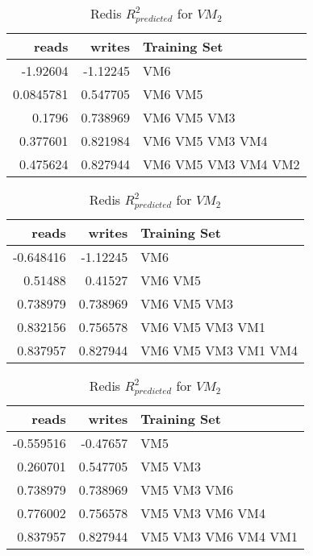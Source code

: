 \begin{table}
\centering
\caption{Redis $R_{predicted}^2$ for $VM_1$}
\begin{tabular}{|r|r|l|} \hline
reads&writes&Training Set\\ \hline
-1.92604 & -1.12245  & VM6 \\ \hline 
0.0845781 &  0.547705 & VM6 VM5 \\ \hline 
0.1796 &  0.738969 & VM6 VM5 VM3 \\ \hline 
0.377601 & 0.821984  & VM6 VM5 VM3 VM4 \\ \hline 
0.475624 &  0.827944 & VM6 VM5 VM3 VM4 VM2 \\ \hline 
\hline\end{tabular}
\label{table:redis1}

\centering
\caption{Redis $R_{predicted}^2$ for $VM_2$}
\begin{tabular}{|r|r|l|} \hline
reads&writes&Training Set\\ \hline
-0.648416 & -1.12245  & VM6 \\ \hline 
0.51488 &  0.41527 & VM6 VM5 \\ \hline 
0.738979 & 0.738969  & VM6 VM5 VM3 \\ \hline 
0.832156 &  0.756578 & VM6 VM5 VM3 VM1 \\ \hline 
0.837957 & 0.827944  & VM6 VM5 VM3 VM1 VM4 \\ \hline 
\hline\end{tabular}
\label{table:redis2}

\centering
\caption{Redis $R_{predicted}^2$ for $VM_2$}
\begin{tabular}{|r|r|l|} \hline
reads&writes&Training Set\\ \hline
-0.559516 & -0.47657  & VM5 \\ \hline 
0.260701 &  0.547705 & VM5 VM3 \\ \hline 
0.738979 &  0.738969 & VM5 VM3 VM6 \\ \hline 
0.776002 & 0.756578  & VM5 VM3 VM6 VM4 \\ \hline 
0.837957 & 0.827944  & VM5 VM3 VM6 VM4 VM1 \\ \hline 
\hline\end{tabular}
\label{table:redis3}


\end{table}
